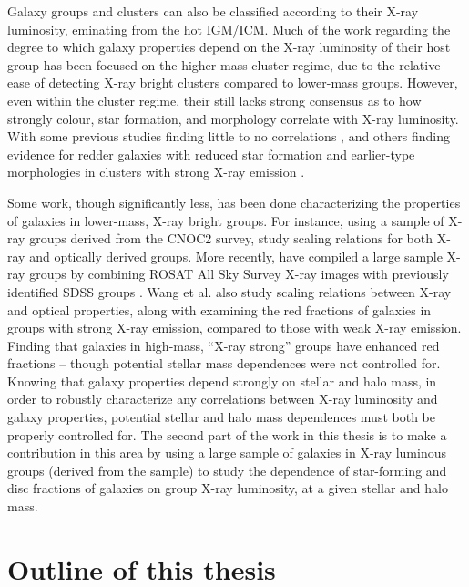 Galaxy groups and clusters can also be classified according to their
X-ray luminosity, eminating from the hot IGM/ICM.  Much of the work
regarding the degree to which galaxy properties depend on the X-ray
luminosity of their host group has been focused on the higher-mass
cluster regime, due to the relative ease of detecting X-ray bright
clusters compared to lower-mass groups.  However, even within the
cluster regime, their still lacks strong consensus as to how strongly
colour, star formation, and morphology correlate with X-ray luminosity.  With
some previous studies finding little to no correlations
\citep{ellingson2001, balogh2002a, fairley2002, wake2005,
  lopes2014}, and others finding evidence for redder
galaxies with reduced star formation and earlier-type morphologies in
clusters with strong X-ray emission \citep{balogh2002b, postman2005,
  urquhart2010}.
\par
Some work, though significantly less, has been done characterizing the
properties of galaxies in lower-mass, X-ray bright groups.  For
instance, \citet{connelly2012} using a sample of X-ray groups derived
from the CNOC2 survey, study scaling relations for both X-ray and
optically derived groups.  More recently, \citet{wang2014} have
compiled a large sample X-ray groups by combining ROSAT All Sky Survey
X-ray images with previously identified SDSS groups \citep{yang2005,
  yang2007}.  Wang et al. also study scaling relations between X-ray
and optical properties, along with examining the red fractions of
galaxies in groups with strong X-ray emission, compared to those with
weak X-ray emission.  Finding that galaxies in high-mass, ``X-ray
strong'' groups have enhanced red fractions -- though potential
stellar mass dependences were not controlled for.  Knowing that galaxy
properties depend strongly on stellar and halo mass, in order to
robustly characterize any correlations between X-ray luminosity and
galaxy properties, potential stellar and halo mass dependences must
both be properly controlled for.  The second part of the work in this thesis
is to make a contribution in this area by using a large sample of
galaxies in X-ray luminous groups (derived from the \citealt{wang2014}
sample) to study the dependence of star-forming and disc fractions of
galaxies on group X-ray luminosity, at a given stellar and halo mass.

\section{Outline of this thesis}
\label{sec:outline}

